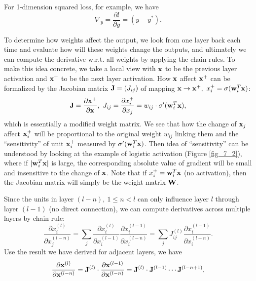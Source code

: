 \documentclass[../main.tex]{subfiles}
\begin{document}
For 1-dimension squared loss, for example, we have
\begin{equation*}
\nabla_{y}=\frac{\partial l}{\partial y}=(y-y^*).
\end{equation*}
\par To determine how weights affect the output, we look from one layer back each time and evaluate how will these weights change the outputs, and ultimately we can compute the derivative w.r.t. all weights by applying the chain rules. To make this idea concrete, we take a local view with ${\bf x}$ to be the previous layer activation and ${\bf x}^+$ to be the next layer activation. How ${\bf x}$ affect ${\bf x}^+$ can be formalized by the Jacobian matrix ${\bf J}=(J_{ij})$ of mapping ${\bf x}\rightarrow{\bf x}^+,\ {x}^+_i = \sigma({\bf w}_i^T{\bf x})$:
\begin{equation*}
{\bf J}=\frac{\partial {\bf x}^+}{\partial {\bf x}},\ J_{ij}=\frac{\partial x_i^+}{\partial x_j}=w_{ij}\cdot \sigma'({\bf w}_i^T{\bf x}),
\end{equation*}
which is essentially a modified weight matrix. We see that how the change of ${\bf x}_j$ affect ${\bf x}^+_i$ will be proportional to the original weight $w_{ij}$ linking them and the ``sensitivity'' of unit ${\bf x}^+_i$ measured by $\sigma'({\bf w}_i^T{\bf x})$. Then idea of ``sensitivity'' can be understood by looking at the example of logistic activation (Figure \ref{fig_7_2}), where if $|{\bf w}_i^T{\bf x}|$ is large, the corresponding absolute value of gradient will be small and insensitive to the change of ${\bf x}$. Note that if ${x}^+_i = {\bf w}_i^T{\bf x}$ (no activation), then the Jacobian matrix will simply be the weight matrix ${\bf W}$.
\par Since the units in layer $(l-n),\ 1\leq n<l$ can only influence layer $l$ through layer $(l-1)$ (no direct connection), we can compute derivatives across multiple layers by chain rule:
\begin{equation*}
\frac{\partial x_i^{(l)}}{\partial x_j^{(l-n)}} = \sum_{j}\frac{\partial x_i^{(l)}}{\partial x_i^{(l-1)}} \frac{\partial x_i^{(l-1)}}{\partial x_i^{(l-n)}} =  \sum_{j} J_{ij}^{(l)} \frac{\partial x_i^{(l-1)}}{\partial x_i^{(l-n)}}.
\end{equation*} 
Use the result we have derived for adjacent layers, we have
\begin{equation*}
\frac{\partial {\bf x}^{(l)}}{\partial {\bf x}^{(l-n)}} = {\bf J}^{(l)}\cdot \frac{\partial {\bf x}^{(l-1)}}{\partial {\bf x}^{(l-n)}}={\bf J}^{(l)}\cdot {\bf J}^{(l-1)}\cdots {\bf J}^{(l-n+1)},
\end{equation*}
\end{document}
